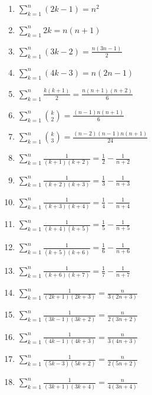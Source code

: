 \documentclass[11pt,a4paper]{article}
\begin{document}
\begin{enumerate}
\item $\displaystyle \sum_{k=1}^{n} \left(2k - 1\right) = n^{2}$
\item $\displaystyle \sum_{k=1}^{n} 2k = n\left(n + 1\right)$
\item $\displaystyle \sum_{k=1}^{n} \left(3k - 2\right) = \frac{n\left(3n - 1\right)}{2}$
\item $\displaystyle \sum_{k=1}^{n} \left(4k - 3\right) = n\left(2n - 1\right)$
\item $\displaystyle \sum_{k=1}^{n} \frac{k\left(k + 1\right)}{2} = \frac{n\left(n + 1\right)\left(n + 2\right)}{6}$
\item $\displaystyle \sum_{k=1}^{n} \binom{k}{2} = \frac{\left(n - 1\right)n\left(n + 1\right)}{6}$
\item $\displaystyle \sum_{k=1}^{n} \binom{k}{3} = \frac{\left(n - 2\right)\left(n - 1\right)n\left(n + 1\right)}{24}$
\item $\displaystyle \sum_{k=1}^{n} \frac{1}{\left(k + 1\right)\left(k + 2\right)} = \frac{1}{2} - \frac{1}{n + 2}$
\item $\displaystyle \sum_{k=1}^{n} \frac{1}{\left(k + 2\right)\left(k + 3\right)} = \frac{1}{3} - \frac{1}{n + 3}$
\item $\displaystyle \sum_{k=1}^{n} \frac{1}{\left(k + 3\right)\left(k + 4\right)} = \frac{1}{4} - \frac{1}{n + 4}$
\item $\displaystyle \sum_{k=1}^{n} \frac{1}{\left(k + 4\right)\left(k + 5\right)} = \frac{1}{5} - \frac{1}{n + 5}$
\item $\displaystyle \sum_{k=1}^{n} \frac{1}{\left(k + 5\right)\left(k + 6\right)} = \frac{1}{6} - \frac{1}{n + 6}$
\item $\displaystyle \sum_{k=1}^{n} \frac{1}{\left(k + 6\right)\left(k + 7\right)} = \frac{1}{7} - \frac{1}{n + 7}$
\item $\displaystyle \sum_{k=1}^{n} \frac{1}{\left(2k + 1\right)\left(2k + 3\right)} = \frac{n}{3\left(2n + 3\right)}$
\item $\displaystyle \sum_{k=1}^{n} \frac{1}{\left(3k - 1\right)\left(3k + 2\right)} = \frac{n}{2\left(3n + 2\right)}$
\item $\displaystyle \sum_{k=1}^{n} \frac{1}{\left(4k - 1\right)\left(4k + 3\right)} = \frac{n}{3\left(4n + 3\right)}$
\item $\displaystyle \sum_{k=1}^{n} \frac{1}{\left(5k - 3\right)\left(5k + 2\right)} = \frac{n}{2\left(5n + 2\right)}$
\item $\displaystyle \sum_{k=1}^{n} \frac{1}{\left(3k + 1\right)\left(3k + 4\right)} = \frac{n}{4\left(3n + 4\right)}$

\end{enumerate}
\end{document}
